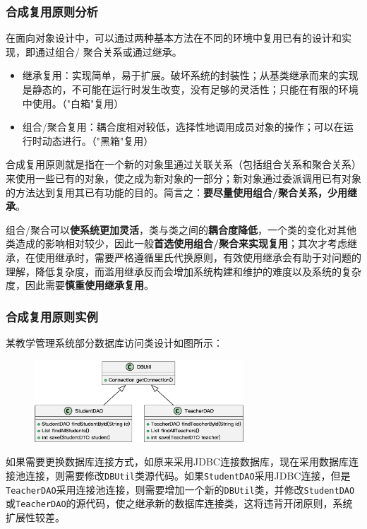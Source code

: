 \subsubsection{合成复用原则分析}
在面向对象设计中，可以通过两种基本方法在不同的环境中复用已有的设计和实现，即通过组合/ 聚合关系或通过继承。
\begin{itemize}
    \item 继承复用：实现简单，易于扩展。破坏系统的封装性；从基类继承而来的实现是静态的，不可能在运行时发生改变，没有足够的灵活性；只能在有限的环境中使用。（"白箱"复用）
    \item 组合/聚合复用：耦合度相对较低，选择性地调用成员对象的操作；可以在运行时动态进行。（"黑箱"复用）
\end{itemize}

合成复用原则就是指在一个新的对象里通过关联关系（包括组合关系和聚合关系）来使用一些已有的对象，使之成为新对象的一部分；新对象通过委派调用已有对象的方法达到复用其已有功能的目的。简言之：\textbf{要尽量使用组合/聚合关系，少用继承}。

组合/聚合可以\textbf{使系统更加灵活}，类与类之间的\textbf{耦合度降低}，一个类的变化对其他类造成的影响相对较少，因此一般\textbf{首选使用组合/聚合来实现复用}；其次才考虑继承，在使用继承时，需要严格遵循里氏代换原则，有效使用继承会有助于对问题的理解，降低复杂度，而滥用继承反而会增加系统构建和维护的难度以及系统的复杂度，因此需要\textbf{慎重使用继承复用}。

\subsubsection{合成复用原则实例}
某教学管理系统部分数据库访问类设计如图所示：
\begin{figure}[H]
    \vspace{-0.5em}
	\centering
	\includegraphics[width=0.7\textwidth]{images/合成复用原则实例1.eps}
    \vspace{-1em}
\end{figure}

如果需要更换数据库连接方式，如原来采用JDBC连接数据库，现在采用数据库连接池连接，则需要修改\;\verb|DBUtil|\;类源代码。如果\;\verb|StudentDAO|\;采用JDBC连接，但是\;\verb|TeacherDAO|\;采用连接池连接，则需要增加一个新的\;\verb|DBUtil|\;类，并修改\;\verb|StudentDAO|\;或\;\verb|TeacherDAO|\;的源代码，使之继承新的数据库连接类，这将违背开闭原则，系统扩展性较差。

